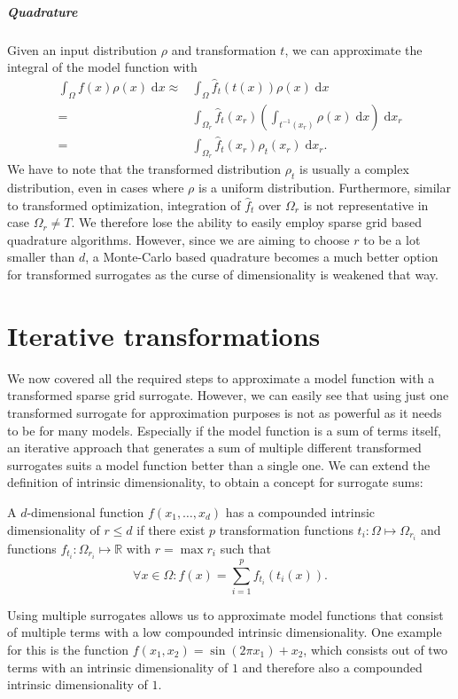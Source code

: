 \documentclass[
  a4paper,  %
  twoside,  %
  bibliography=totoc,
  headsepline,
  cleardoublepage=empty,
  parskip=half,
  draft=false
]{scrbook}
\begin{document}
\paragraph{Quadrature}
Given an input distribution $\rho$ and transformation $t$, we can approximate the integral of the model function with
\begin{equation}
\begin{split}
\int_{\Omega} f(x) \rho(x) \; \text{d}x \approx &\int_{\Omega} \hat{f}_t(t(x)) \rho(x) \; \text{d}x\\
=&\int_{\Omega_r} \hat{f}_t(x_r) \left(\int_{t^{-1}(x_r)} \rho(x)  \; \text{d}x \right)  \; \text{d}x_r\\
=&\int_{\Omega_r} \hat{f}_t(x_r) \rho_t(x_r) \; \text{d}x_r.
\end{split}
\end{equation}
We have to note that the transformed distribution $\rho_t$ is usually a complex distribution, even in cases where $\rho$ is a uniform distribution.
Furthermore, similar to transformed optimization, integration of $\hat{f}_t$ over $\Omega_r$ is not representative in case $\Omega_r \neq T$.
We therefore lose the ability to easily employ sparse grid based quadrature algorithms.
However, since we are aiming to choose $r$ to be a lot smaller than $d$, a Monte-Carlo based quadrature becomes a much better option for transformed surrogates as the curse of dimensionality is weakened that way.

\chapter{Iterative transformations}
\label{chap:c5}

We now covered all the required steps to approximate a model function with a transformed sparse grid surrogate.
However, we can easily see that using just one transformed surrogate for approximation purposes is not as powerful as it needs to be for many models.
Especially if the model function is a sum of terms itself, an iterative approach that generates a sum of multiple different transformed surrogates suits a model function better than a single one.
We can extend the definition of intrinsic dimensionality, to obtain a concept for surrogate sums:
\begin{definition}
A $d$-dimensional function $f(x_1, \dots, x_d)$ has a compounded intrinsic dimensionality of $r \leq d$ if there exist $p$ transformation functions $t_i \colon \Omega \mapsto \Omega_{r_i}$ and functions $f_{t_i} \colon \Omega_{r_i} \mapsto \mathds{R}$ with $r=\max r_i$ such that
\begin{equation}
\forall x \in \Omega \colon f(x)=\sum_{i=1}^p f_{t_i}(t_i(x)).
\end{equation}
\label{def:intrinsic_sum}
\end{definition}
%
Using multiple surrogates allows us to approximate model functions that consist of multiple terms with a low compounded intrinsic dimensionality.
One example for this is the function $f(x_1, x_2)=\sin(2 \pi x_1) + x_2$, which consists out of two terms with an intrinsic dimensionality of $1$ and therefore also a compounded intrinsic dimensionality of $1$.
\end{document}
